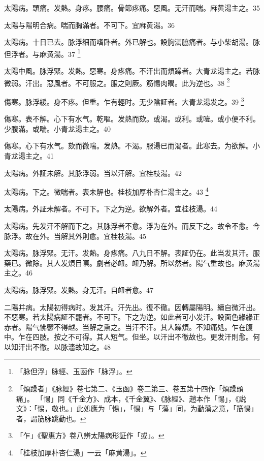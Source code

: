 太陽病。頭痛。发熱。身疼。腰痛。骨節疼痛。惡風。无汗而喘。麻黄湯主之。35

太陽与陽明合病。喘而胸滿者。不可下。宜麻黄湯。36

太陽病。十日已去。脉浮細而嗜卧者。外已解也。設胸滿脇痛者。与小柴胡湯。脉{\khaaitp 但}浮者。与麻黄湯。37
	\footnote{
		「脉但浮」脉經、玉函作「脉浮」。
	}

太陽中風。脉浮緊。发熱。惡寒。身疼痛。不汗出而煩躁者。大青龙湯主之。若脉微弱。汗出。惡風者。不可服之。服之則厥。筋愓肉瞤。此为逆也。38
	\footnote{
		「煩躁者」《脉經》卷七第二、《玉函》卷二第三、卷五第十四作「煩躁頭痛」。
		「愓」同《千金方》、成本，《千金翼》、《脉經》、趙本作「惕」，《説文》：「惕，敬也。」此処應为「愓」，「愓」与「蕩」同，为動蕩之意，「筋愓」者，謂筋脉跳動也。
	}

傷寒。脉浮緩。身不疼。但重。乍有輕时。无少陰証者。大青龙湯发之。39
	\footnote{
		「乍」《聖惠方》卷八辨太陽病形証作「或」。
	}

傷寒。表不解。心下有水气。乾嘔。发熱而欬。或渴。或利。或噎。或小便不利。少腹滿。或喘。小青龙湯主之。40

傷寒。心下有水气。欬而微喘。发熱。不渴。服湯已而渴者。此寒去。为欲解。小青龙湯主之。41

太陽病。外証未解。其脉浮弱。当以汗解。宜桂枝湯。42

太陽病。下之。微喘者。表未解也。桂枝{\khaaitp 加厚朴杏仁}湯主之。43
	\footnote{
		「桂枝加厚朴杏仁湯」一云「麻黄湯」。
	}

太陽病。外証未解者。不可下。下之为逆。欲解外者。宜桂枝湯。44

太陽病。先发汗不解而下之。其脉浮者不愈。浮为在外。而反下之。故令不愈。今脉浮。故在外。当解其外則愈。宜桂枝湯。45

太陽病。脉浮緊。无汗。发熱。身疼痛。八九日不解。表証仍在。此当发其汗。服藥已。微除。其人发煩目暝。劇者必衄。衄乃解。所以然者。陽气重故也。麻黄湯主之。46

太陽病。脉浮緊。发熱。身无汗。自衄者愈。47

二陽并病。太陽初得病时。发其汗。汗先出{\khaaitp 。復}不徹。因轉屬陽明。續自微汗出。不惡寒。若太陽病証不罷者。不可下。下之为逆。如此者可小发汗。設面色緣緣正赤者。陽气怫鬱不得越。当解之熏之。当汗不汗。其人躁煩。不知痛処。乍在腹中。乍在四肢。按之不可得。其人短气。但坐。以汗出不徹故也。更发汗則愈。何以知汗出不徹。以脉濇故知之。48

